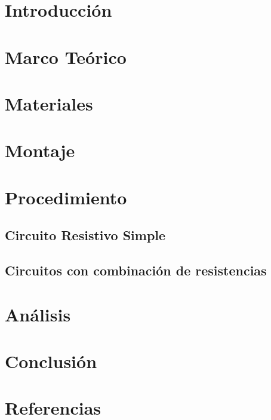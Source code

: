 \documentclass{article}
\begin{document}
\begin{multicols}{2}

\section{Introducción}

\section{Marco Teórico}

\section{Materiales}

\section{Montaje}

\section{Procedimiento}

\subsection{Circuito Resistivo Simple}

\subsection{Circuitos con combinación de resistencias}

\section{Análisis}

\section{Conclusión}

\section{Referencias}

\end{multicols}
\end{document}
